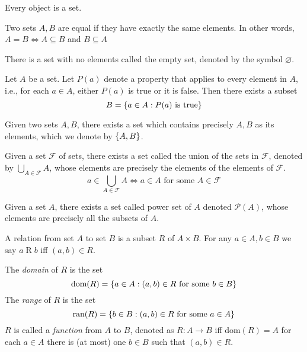 \documentclass[12pt]{article}
\begin{document}
\begin{axiom} \label{zfc:basic}
    Every object is a set.
\end{axiom}

\begin{axiom} \label{zfc:extension}
    Two sets $A, B$ are equal if they have exactly the same elements.
    In other words, $A = B \iff A \subseteq B$ and $B \subseteq A$
\end{axiom}

\begin{axiom} \label{zfc:existence}
    There is a set with no elements called the empty set, denoted by the symbol $\varnothing$.
\end{axiom}

\begin{axiom} \label{zfc:specification}
    Let $A$ be a set. Let $P(a)$ denote a property that applies to every element in $A$, i.e., for each $a \in A$, either $P(a)$ is true or it is false. Then there exists a subset
    \[
        B = \set{a \in A: P(a) \text{ is true}}
    \]
\end{axiom}

\begin{axiom}\label{zfc:pairing}
    Given two sets $A, B$, there exists a set which contains precisely $A, B$ as its elements, which we denote by $\set{A, B}$.
\end{axiom}

\begin{axiom} \label{zfc:unions}
    Given a set $\mathscr{F}$ of sets, there exists a set called the union of the sets in $\mathscr{F}$, denoted by $\bigcup_{A \in \mathscr{F}} A$, whose elements are precisely the elements of the elements of $\mathscr{F}$.
    \[
        a \in \bigcup_{A \in \mathscr{F}} A \iff a \in A \text{ for some } A \in \mathscr{F}
    \]
\end{axiom}

\begin{axiom} \label{zfc:powers}
    Given a set $A$, there exists a set called power set of $A$ denoted $\mathscr{P}(A)$, whose elements are precisely all the subsets of $A$.   
\end{axiom}

\begin{defn} \label{defn:relation}
    A relation from set $A$ to set $B$ is a subset $R$ of $A \times B$. For any $a \in A, b \in B$ we say $a\mathrel{R}b$ iff $(a, b) \in R$.
    \begin{outline}
        \1 The \emph{domain} of $R$ is the set
        \[
            \text{dom}(R) = \set{ a \in A : (a, b) \in R \text{ for some } b \in B}
        \]
        \1 The \emph{range} of $R$ is the set
        \[
            \text{ran}(R) = \set{ b \in B : (a, b) \in R \text{ for some } a \in A}
        \]
        \1 $R$ is called a \emph{function} from $A$ to $B$, denoted as $R: A \to B$ iff
            \2 dom$(R) = A$
            \2 for each $a \in A$ there is (at most) one $b \in B$ such that $(a, b) \in R$.
    \end{outline}
\end{defn}
\end{document}
